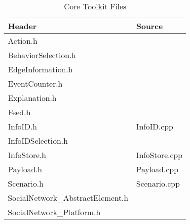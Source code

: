 \begin{table}[H]
\begin{center}
\caption{Core Toolkit Files}
\label{table:CoreToolkitFiles}
\begin{tabular}{l | l}
\hline
 Header & Source \\
\hline
 Action.h & \\
 BehaviorSelection.h & \\
 EdgeInformation.h & \\
 EventCounter.h & \\
 Explanation.h & \\
 Feed.h & \\
 InfoID.h & InfoID.cpp \\
 InfoIDSelection.h & \\
 InfoStore.h & InfoStore.cpp \\	
 Payload.h & Payload.cpp \\
 Scenario.h & Scenario.cpp \\
 SocialNetwork\_AbstractElement.h & \\
 SocialNetwork\_Platform.h & \\
\end{tabular}
\end{center}
\end{table}

